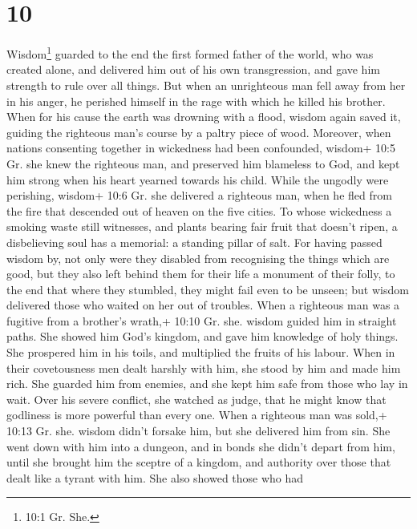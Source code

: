\hypertarget{section-9}{%
\section{10}\label{section-9}}

 Wisdom\footnote{10:1 Gr. She.} guarded to the end the first
formed father of the world, who was created alone, and delivered him out
of his own transgression,  and gave him strength to rule
over all things.  But when an unrighteous man fell away from
her in his anger, he perished himself in the rage with which he killed
his brother.  When for his cause the earth was drowning with
a flood, wisdom again saved it, guiding the righteous man's course by a
paltry piece of wood.  Moreover, when nations consenting
together in wickedness had been confounded, wisdom+ 10:5 Gr. she knew
the righteous man, and preserved him blameless to God, and kept him
strong when his heart yearned towards his child.  While the
ungodly were perishing, wisdom+ 10:6 Gr. she delivered a righteous man,
when he fled from the fire that descended out of heaven on the five
cities.  To whose wickedness a smoking waste still
witnesses, and plants bearing fair fruit that doesn't ripen, a
disbelieving soul has a memorial: a standing pillar of salt.
 For having passed wisdom by, not only were they disabled
from recognising the things which are good, but they also left behind
them for their life a monument of their folly, to the end that where
they stumbled, they might fail even to be unseen;  but
wisdom delivered those who waited on her out of troubles. 
When a righteous man was a fugitive from a brother's wrath,+ 10:10 Gr.
she. wisdom guided him in straight paths. She showed him God's kingdom,
and gave him knowledge of holy things. She prospered him in his toils,
and multiplied the fruits of his labour.  When in their
covetousness men dealt harshly with him, she stood by him and made him
rich.  She guarded him from enemies, and she kept him safe
from those who lay in wait. Over his severe conflict, she watched as
judge, that he might know that godliness is more powerful than every
one.  When a righteous man was sold,+ 10:13 Gr. she. wisdom
didn't forsake him, but she delivered him from sin. She went down with
him into a dungeon,  and in bonds she didn't depart from
him, until she brought him the sceptre of a kingdom, and authority over
those that dealt like a tyrant with him. She also showed those who had
